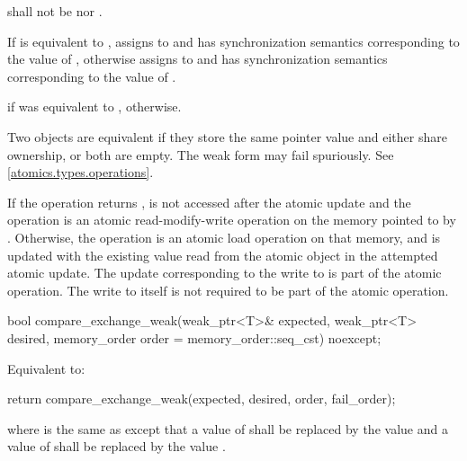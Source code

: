 \begin{itemdescr}
\pnum
\requires
{} shall not be
 nor .

\pnum
\effects
If  is equivalent to ,
assigns  to  and
has synchronization semantics corresponding to the value of ,
otherwise assigns  to  and
has synchronization semantics corresponding to the value of .

\pnum
\returns
{} if  was equivalent to ,
 otherwise.

\pnum
\remarks
Two  objects are equivalent if
they store the same pointer value and
either share ownership, or both are empty.
The weak form may fail spuriously. See \ref{atomics.types.operations}.

\pnum
If the operation returns ,
 is not accessed after the atomic update and
the operation is an atomic read-modify-write operation
on the memory pointed to by .
Otherwise, the operation is an atomic load operation on that memory, and
 is updated with the existing value
read from the atomic object in the attempted atomic update.
The  update corresponding to the write to 
is part of the atomic operation.
The write to  itself
is not required to be part of the atomic operation.
\end{itemdescr}

%
\begin{itemdecl}
bool compare_exchange_weak(weak_ptr<T>& expected, weak_ptr<T> desired,
                           memory_order order = memory_order::seq_cst) noexcept;
\end{itemdecl}

\begin{itemdescr}
\pnum
\effects
Equivalent to:
\begin{codeblock}
return compare_exchange_weak(expected, desired, order, fail_order);
\end{codeblock}
where  is the same as 
except that a value of 
shall be replaced by the value  and
a value of 
shall be replaced by the value .
\end{itemdescr}

